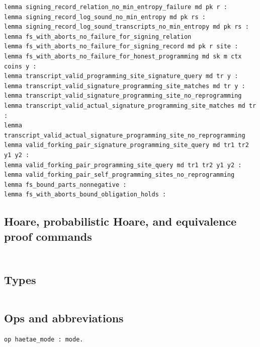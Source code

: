 \begin{lstlisting}[language=EasyCrypt,basicstyle=\ttfamily\tiny]
lemma signing_record_relation_no_min_entropy_failure md pk r :
lemma signing_record_log_sound_no_min_entropy md pk rs :
lemma signing_record_log_sound_transcripts_no_min_entropy md pk rs :
lemma fs_with_aborts_no_failure_for_signing_relation
lemma fs_with_aborts_no_failure_for_signing_record md pk r site :
lemma fs_with_aborts_no_failure_for_honest_programming md sk m ctx coins y :
lemma transcript_valid_programming_site_signature_query md tr y :
lemma transcript_valid_signature_programming_site_matches md tr y :
lemma transcript_valid_signature_programming_site_no_reprogramming
lemma transcript_valid_actual_signature_programming_site_matches md tr :
lemma transcript_valid_actual_signature_programming_site_no_reprogramming
lemma valid_forking_pair_signature_programming_site_query md tr1 tr2 y1 y2 :
lemma valid_forking_pair_programming_site_query md tr1 tr2 y1 y2 :
lemma valid_forking_pair_self_programming_sites_no_reprogramming
lemma fs_bound_parts_nonnegative :
lemma fs_with_aborts_bound_obligation_holds :
\end{lstlisting}

\subsection*{Hoare, probabilistic Hoare, and equivalence proof commands}
\begin{lstlisting}[language=EasyCrypt,basicstyle=\ttfamily\tiny]
\end{lstlisting}

\section*{}

\subsection*{Types}
\begin{lstlisting}[language=EasyCrypt,basicstyle=\ttfamily\tiny]
\end{lstlisting}

\subsection*{Ops and abbreviations}
\begin{lstlisting}[language=EasyCrypt,basicstyle=\ttfamily\tiny]
op haetae_mode : mode.
\end{lstlisting}


